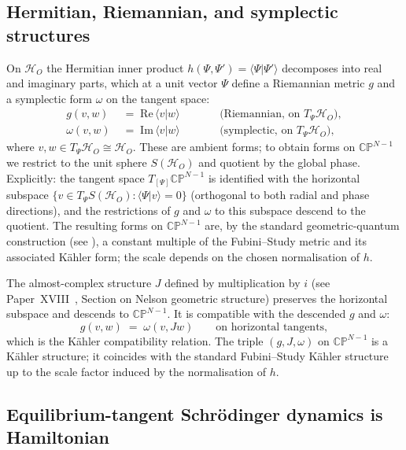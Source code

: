 \documentclass[12pt]{article}
\begin{document}
\subsection{Hermitian, Riemannian, and symplectic structures}\label{subsec:structures}

On $\mathcal{H}_O$ the Hermitian inner product $h(\Psi, \Psi') = \langle\Psi|\Psi'\rangle$ decomposes into real and imaginary parts, which at a unit vector $\Psi$ define a Riemannian metric $g$ and a symplectic form $\omega$ on the tangent space:
\begin{align}
    g(v, w) &\;=\; \mathrm{Re}\,\langle v|w\rangle \qquad && \text{(Riemannian, on }T_\Psi \mathcal{H}_O\text{)}, \label{eq:g_from_h} \\
    \omega(v, w) &\;=\; \mathrm{Im}\,\langle v|w\rangle \qquad && \text{(symplectic, on }T_\Psi \mathcal{H}_O\text{)}, \label{eq:omega_from_h}
\end{align}
where $v, w \in T_\Psi \mathcal{H}_O \cong \mathcal{H}_O$. These are ambient forms; to obtain forms on $\mathbb{CP}^{N-1}$ we restrict to the unit sphere $S(\mathcal{H}_O)$ and quotient by the global phase. Explicitly: the tangent space $T_{[\Psi]}\mathbb{CP}^{N-1}$ is identified with the horizontal subspace $\{v \in T_\Psi S(\mathcal{H}_O) : \langle\Psi|v\rangle = 0\}$ (orthogonal to both radial and phase directions), and the restrictions of $g$ and $\omega$ to this subspace descend to the quotient. The resulting forms on $\mathbb{CP}^{N-1}$ are, by the standard geometric-quantum construction (see \citep{AshtekarSchilling1999, KobayashiNomizu1969}), a constant multiple of the Fubini--Study metric and its associated K\"ahler form; the scale depends on the chosen normalisation of $h$.

The almost-complex structure $J$ defined by multiplication by $i$ (see Paper~XVIII~\citep{SmartXVIII}, Section on Nelson geometric structure) preserves the horizontal subspace and descends to $\mathbb{CP}^{N-1}$. It is compatible with the descended $g$ and $\omega$:
\begin{equation}\label{eq:compat}
    g(v, w) \;=\; \omega(v, J w) \qquad \text{on horizontal tangents},
\end{equation}
which is the K\"ahler compatibility relation. The triple $(g, J, \omega)$ on $\mathbb{CP}^{N-1}$ is a K\"ahler structure; it coincides with the standard Fubini--Study K\"ahler structure up to the scale factor induced by the normalisation of $h$.

\subsection{Equilibrium-tangent Schr\"odinger dynamics is Hamiltonian}\label{subsec:hamiltonian}
\end{document}
